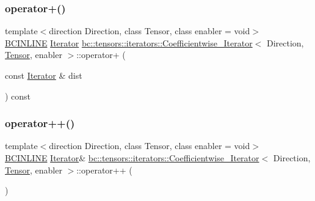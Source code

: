 \subsubsection{\texorpdfstring{operator+()}{operator+()}\hspace{0.1cm}{\footnotesize\ttfamily [2/2]}}
{\footnotesize\ttfamily template$<$direction Direction, class Tensor, class enabler = void$>$ \\
\hyperlink{common_8h_a6699e8b0449da5c0fafb878e59c1d4b1}{B\+C\+I\+N\+L\+I\+NE} \hyperlink{structbc_1_1tensors_1_1iterators_1_1Coefficientwise__Iterator_a313f76f47e60a806035279a36a84f835}{Iterator} \hyperlink{structbc_1_1tensors_1_1iterators_1_1Coefficientwise__Iterator}{bc\+::tensors\+::iterators\+::\+Coefficientwise\+\_\+\+Iterator}$<$ Direction, \hyperlink{namespacebc_a659391e47ab612be3ba6c18cf9c89159}{Tensor}, enabler $>$\+::operator+ (\begin{DoxyParamCaption}\item[{const \hyperlink{structbc_1_1tensors_1_1iterators_1_1Coefficientwise__Iterator_a313f76f47e60a806035279a36a84f835}{Iterator} \&}]{dist }\end{DoxyParamCaption}) const\hspace{0.3cm}{\ttfamily [inline]}}

\mbox{\label{structbc_1_1tensors_1_1iterators_1_1Coefficientwise__Iterator_a947dae462bfcfc1da03237218b42d7ea}} 
\subsubsection{\texorpdfstring{operator++()}{operator++()}\hspace{0.1cm}{\footnotesize\ttfamily [1/2]}}
{\footnotesize\ttfamily template$<$direction Direction, class Tensor, class enabler = void$>$ \\
\hyperlink{common_8h_a6699e8b0449da5c0fafb878e59c1d4b1}{B\+C\+I\+N\+L\+I\+NE} \hyperlink{structbc_1_1tensors_1_1iterators_1_1Coefficientwise__Iterator_a313f76f47e60a806035279a36a84f835}{Iterator}\& \hyperlink{structbc_1_1tensors_1_1iterators_1_1Coefficientwise__Iterator}{bc\+::tensors\+::iterators\+::\+Coefficientwise\+\_\+\+Iterator}$<$ Direction, \hyperlink{namespacebc_a659391e47ab612be3ba6c18cf9c89159}{Tensor}, enabler $>$\+::operator++ (\begin{DoxyParamCaption}{ }\end{DoxyParamCaption})\hspace{0.3cm}{\ttfamily [inline]}}

